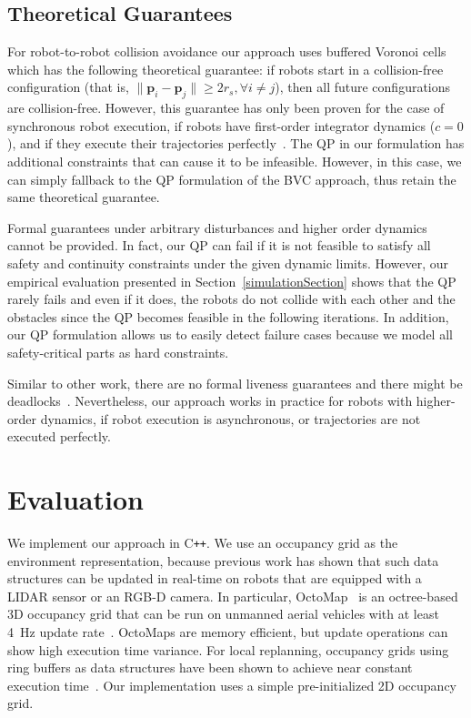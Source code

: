 \documentclass{svproc}
\newcommand{\vp}{\mathbf{p}}
\begin{document}
\subsection{Theoretical Guarantees} \label{theoreticalGuarantees}
For robot-to-robot collision avoidance our approach uses buffered Voronoi cells which has the following theoretical guarantee:
if robots start in a collision-free configuration (that is, $\|\vp_i - \vp_j\| \geq 2r_s, \forall i\neq j$), then all future configurations are collision-free.
However, this guarantee has only been proven for the case of synchronous robot execution, if robots have first-order integrator dynamics ($c=0$), and if they execute their trajectories perfectly~\cite{bufferedVoronoiCells}.
The QP in our formulation has additional constraints that can cause it to be infeasible. However, in this case, we can simply fallback to the QP formulation of the BVC approach, thus retain the same theoretical guarantee.

Formal guarantees under arbitrary disturbances and higher order dynamics cannot be provided.
In fact, our QP can fail if it is not feasible to satisfy all safety and continuity constraints under the given dynamic limits.
However, our empirical evaluation presented in Section~\ref{simulationSection} shows that the QP rarely fails and even if it does, the robots do not collide with each other and the obstacles since the QP becomes feasible in the following iterations.
In addition, our QP formulation allows us to easily detect failure cases because we model all safety-critical parts as hard constraints.

Similar to other work, there are no formal liveness guarantees and there might be deadlocks~\cite{bufferedVoronoiCells}.
Nevertheless, our approach works in practice for robots with higher-order dynamics, if robot execution is asynchronous, or trajectories are not executed perfectly.


\section{Evaluation} \label{evaluationSection}
We implement our approach in C\texttt{++}.
We use an occupancy grid as the environment representation, because previous work has shown that such data structures can be updated in real-time on robots that are equipped with a LIDAR sensor or an RGB-D camera.
In particular, OctoMap~\cite{octomap} is an octree-based 3D occupancy grid that can be run on unmanned aerial vehicles with at least \SI{4}{Hz} update rate~\cite{replanning-eth}.
OctoMaps are memory efficient, but update operations can show high execution time variance.
For local replanning, occupancy grids using ring buffers as data structures have been shown to achieve near constant execution time~\cite{replanning-usenko}.
Our implementation uses a simple pre-initialized 2D occupancy grid.
\end{document}

